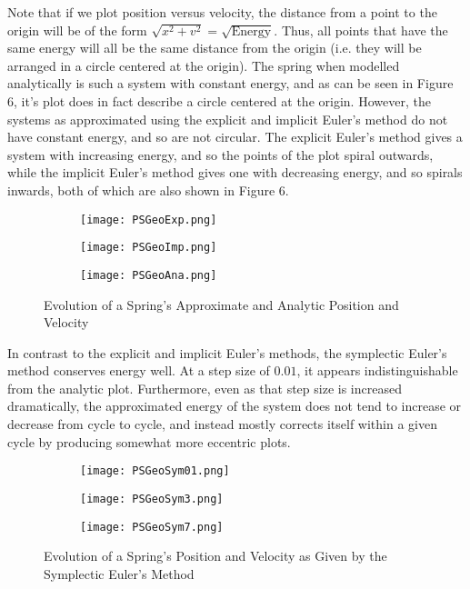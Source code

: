 \documentclass[10pt]{article}
\newenvironment{problem}[2][Problem]{\begin{trivlist}
\item[\hskip \labelsep {\bfseries #1}\hskip \labelsep {\bfseries #2.}]}{\end{trivlist}}
\begin{document}
\begin{problem} {6}
Note that if we plot position versus velocity, the distance from a point to the origin will be of the form $\sqrt{x^2+v^2}=\sqrt{\text{Energy}}$. Thus, all points that have the same energy will all be the same distance from the origin (i.e. they will be arranged in a circle centered at the origin). The spring when modelled analytically is such a system with constant energy, and as can be seen in Figure 6, it's plot does in fact describe a circle centered at the origin. However, the systems as approximated using the explicit and implicit Euler's method do not have constant energy, and so are not circular. The explicit Euler's method gives a system with increasing energy, and so the points of the plot spiral outwards, while the implicit Euler's method gives one with decreasing energy, and so spirals inwards, both of which are also shown in Figure 6.
\begin{figure}[h]
\centering
\begin{subfigure}{.3\textwidth}
  \centering
  \texttt{[image: PSGeoExp.png]}
\end{subfigure}%
\begin{subfigure}{.3\textwidth}
  \centering
  \texttt{[image: PSGeoImp.png]}
\end{subfigure}
\begin{subfigure}{.3\textwidth}
  \centering
  \texttt{[image: PSGeoAna.png]}
\end{subfigure}
\caption{Evolution of a Spring's Approximate and Analytic Position and Velocity}
\end{figure}
\end{problem}

\begin{problem} {7}
In contrast to the explicit and implicit Euler's methods, the symplectic Euler's method conserves energy well. At a step size of $0.01$, it appears indistinguishable from the analytic plot. Furthermore, even as that step size is increased dramatically, the approximated energy of the system does not tend to increase or decrease from cycle to cycle, and instead mostly corrects itself within a given cycle by producing somewhat more eccentric plots.

\begin{figure}[h]
\centering
\begin{subfigure}{.3\textwidth}
  \centering
  \texttt{[image: PSGeoSym01.png]}
\end{subfigure}%
\begin{subfigure}{.3\textwidth}
  \centering
  \texttt{[image: PSGeoSym3.png]}
\end{subfigure}
\begin{subfigure}{.3\textwidth}
  \centering
  \texttt{[image: PSGeoSym7.png]}
\end{subfigure}
\caption{Evolution of a Spring's Position and Velocity as Given by the Symplectic Euler's Method}
\end{figure}
\end{problem}
\end{document}
